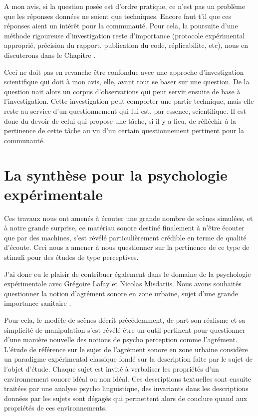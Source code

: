 A mon avis, si la question posée est d'ordre pratique, ce n'est pas un problème que les réponses données ne soient que techniques. Encore faut t'il que ces réponses aient un intérêt pour la communauté. Pour cela, la poursuite d'une méthode rigoureuse d'investigation reste d'importance (protocole expérimental approprié, précision du rapport, publication du code, réplicabilite, etc), nous en discuterons dans le Chapitre \nameref{}.

Ceci ne doit pas en revanche être confondue avec une approche d'investigation scientifique qui doit à mon avis, elle, avant tout se baser sur une question. De la question nait alors un corpus d'observations qui peut servir ensuite de base à l'investigation. Cette investigation peut comporter une partie technique, mais elle reste au service d'un questionnement qui lui est, par essence, scientifique. Il est donc du devoir de celui qui propose une tâche, si il y a lieu, de réfléchir à la pertinence de cette tâche au vu d'un certain questionnement pertinent pour la communauté.


\section{La synthèse pour la psychologie expérimentale} \label{sec:psycho}

Ces travaux nous ont amenés à écouter une grande nombre de scènes simulées, et à notre grande surprise, ce matériau sonore destiné finalement à n'être écouter que par des machines, s'est révélé particulièrement crédible en terme de qualité d'écoute. Ceci nous a amener à nous questionner sur la pertinence de ce type de stimuli pour des études de type perceptives.

J'ai donc eu le plaisir de contribuer également dans le domaine de la psychologie expérimentale avec Grégoire Lafay et Nicolas Misdariis. Nous avons souhaités questionner la notion d'agrément sonore en zone urbaine, sujet d'une grande importance sanitaire \cite{europe}.

Pour cela, le modèle de scènes décrit précédemment, de part son réalisme et sa simplicité de manipulation s'est révélé être un outil pertinent pour questionner d'une manière nouvelle des notions de psycho perception comme l'agrément. L'étude de référence sur le sujet de l'agrément sonore en zone urbaine \cite{guastavino} considère un paradigme expérimental classique fondé sur la description faite par le sujet de l'objet d'étude. Chaque sujet est invité à verbaliser les propriétés d'un environnement sonore idéal ou non idéal. Ces descriptions textuelles sont ensuite traitées par une analyse psycho linguistique, des invariants dans les descriptions données par les sujets sont dégagés qui permettent alors de conclure quand aux propriétés de ces environnements.

